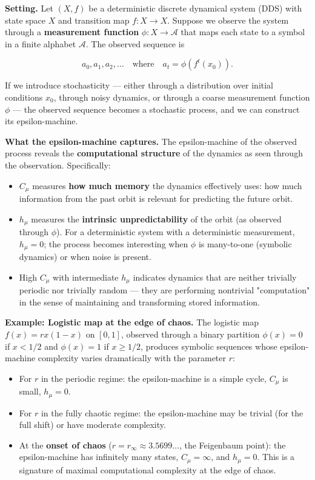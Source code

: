 \textbf{Setting.} Let $(X, f)$ be a deterministic discrete dynamical system (DDS) with state space $X$ and transition map $f: X \to X$. Suppose we observe the system through a \textbf{measurement function} $\phi: X \to \mathcal{A}$ that maps each state to a symbol in a finite alphabet $\mathcal{A}$. The observed sequence is

\[a_0, a_1, a_2, \ldots \quad \text{where} \quad a_t = \phi(f^t(x_0)).\]

If we introduce stochasticity --- either through a distribution over initial conditions $x_0$, through noisy dynamics, or through a coarse measurement function $\phi$ --- the observed sequence becomes a stochastic process, and we can construct its epsilon-machine.

\textbf{What the epsilon-machine captures.} The epsilon-machine of the observed process reveals the \textbf{computational structure} of the dynamics as seen through the observation. Specifically:

\begin{itemize}
\item $C_\mu$ measures \textbf{how much memory} the dynamics effectively uses: how much information from the past orbit is relevant for predicting the future orbit.
\item $h_\mu$ measures the \textbf{intrinsic unpredictability} of the orbit (as observed through $\phi$). For a deterministic system with a deterministic measurement, $h_\mu = 0$; the process becomes interesting when $\phi$ is many-to-one (symbolic dynamics) or when noise is present.
\item High $C_\mu$ with intermediate $h_\mu$ indicates dynamics that are neither trivially periodic nor trivially random --- they are performing nontrivial "computation" in the sense of maintaining and transforming stored information.
\end{itemize}

\textbf{Example: Logistic map at the edge of chaos.} The logistic map $f(x) = rx(1-x)$ on $[0,1]$, observed through a binary partition $\phi(x) = 0$ if $x < 1/2$ and $\phi(x) = 1$ if $x \geq 1/2$, produces symbolic sequences whose epsilon-machine complexity varies dramatically with the parameter $r$:

\begin{itemize}
\item For $r$ in the periodic regime: the epsilon-machine is a simple cycle, $C_\mu$ is small, $h_\mu = 0$.
\item For $r$ in the fully chaotic regime: the epsilon-machine may be trivial (for the full shift) or have moderate complexity.
\item At the \textbf{onset of chaos} ($r = r_\infty \approx 3.5699\ldots$, the Feigenbaum point): the epsilon-machine has infinitely many states, $C_\mu = \infty$, and $h_\mu = 0$. This is a signature of maximal computational complexity at the edge of chaos.
\end{itemize}

